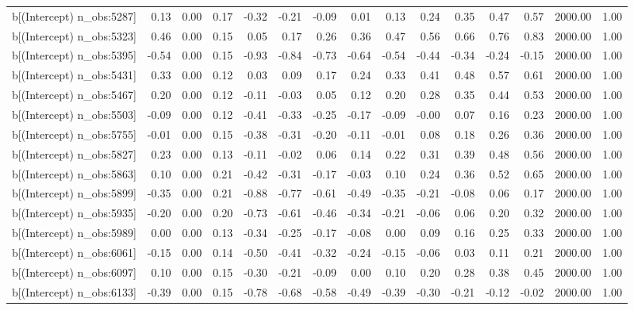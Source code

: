 \begin{table}[ht]
\begin{tabular}{rrrrrrrrrrrrrrr}
  b[(Intercept) n\_obs:5287] & 0.13 & 0.00 & 0.17 & -0.32 & -0.21 & -0.09 & 0.01 & 0.13 & 0.24 & 0.35 & 0.47 & 0.57 & 2000.00 & 1.00 \\ 
  b[(Intercept) n\_obs:5323] & 0.46 & 0.00 & 0.15 & 0.05 & 0.17 & 0.26 & 0.36 & 0.47 & 0.56 & 0.66 & 0.76 & 0.83 & 2000.00 & 1.00 \\ 
  b[(Intercept) n\_obs:5395] & -0.54 & 0.00 & 0.15 & -0.93 & -0.84 & -0.73 & -0.64 & -0.54 & -0.44 & -0.34 & -0.24 & -0.15 & 2000.00 & 1.00 \\ 
  b[(Intercept) n\_obs:5431] & 0.33 & 0.00 & 0.12 & 0.03 & 0.09 & 0.17 & 0.24 & 0.33 & 0.41 & 0.48 & 0.57 & 0.61 & 2000.00 & 1.00 \\ 
  b[(Intercept) n\_obs:5467] & 0.20 & 0.00 & 0.12 & -0.11 & -0.03 & 0.05 & 0.12 & 0.20 & 0.28 & 0.35 & 0.44 & 0.53 & 2000.00 & 1.00 \\ 
  b[(Intercept) n\_obs:5503] & -0.09 & 0.00 & 0.12 & -0.41 & -0.33 & -0.25 & -0.17 & -0.09 & -0.00 & 0.07 & 0.16 & 0.23 & 2000.00 & 1.00 \\ 
  b[(Intercept) n\_obs:5755] & -0.01 & 0.00 & 0.15 & -0.38 & -0.31 & -0.20 & -0.11 & -0.01 & 0.08 & 0.18 & 0.26 & 0.36 & 2000.00 & 1.00 \\ 
  b[(Intercept) n\_obs:5827] & 0.23 & 0.00 & 0.13 & -0.11 & -0.02 & 0.06 & 0.14 & 0.22 & 0.31 & 0.39 & 0.48 & 0.56 & 2000.00 & 1.00 \\ 
  b[(Intercept) n\_obs:5863] & 0.10 & 0.00 & 0.21 & -0.42 & -0.31 & -0.17 & -0.03 & 0.10 & 0.24 & 0.36 & 0.52 & 0.65 & 2000.00 & 1.00 \\ 
  b[(Intercept) n\_obs:5899] & -0.35 & 0.00 & 0.21 & -0.88 & -0.77 & -0.61 & -0.49 & -0.35 & -0.21 & -0.08 & 0.06 & 0.17 & 2000.00 & 1.00 \\ 
  b[(Intercept) n\_obs:5935] & -0.20 & 0.00 & 0.20 & -0.73 & -0.61 & -0.46 & -0.34 & -0.21 & -0.06 & 0.06 & 0.20 & 0.32 & 2000.00 & 1.00 \\ 
  b[(Intercept) n\_obs:5989] & 0.00 & 0.00 & 0.13 & -0.34 & -0.25 & -0.17 & -0.08 & 0.00 & 0.09 & 0.16 & 0.25 & 0.33 & 2000.00 & 1.00 \\ 
  b[(Intercept) n\_obs:6061] & -0.15 & 0.00 & 0.14 & -0.50 & -0.41 & -0.32 & -0.24 & -0.15 & -0.06 & 0.03 & 0.11 & 0.21 & 2000.00 & 1.00 \\ 
  b[(Intercept) n\_obs:6097] & 0.10 & 0.00 & 0.15 & -0.30 & -0.21 & -0.09 & 0.00 & 0.10 & 0.20 & 0.28 & 0.38 & 0.45 & 2000.00 & 1.00 \\ 
  b[(Intercept) n\_obs:6133] & -0.39 & 0.00 & 0.15 & -0.78 & -0.68 & -0.58 & -0.49 & -0.39 & -0.30 & -0.21 & -0.12 & -0.02 & 2000.00 & 1.00 \\ 

\end{tabular}
\end{table}
